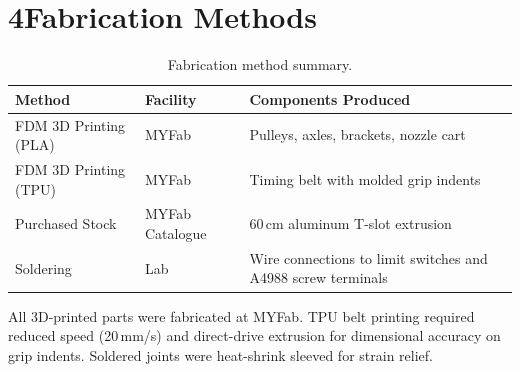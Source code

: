 \documentclass[12pt]{article}
\begin{document}
\section{4\quad Fabrication Methods}

\begin{table}[H]
\centering
\small
\begin{tabularx}{\textwidth}{@{}l l X@{}}
\toprule
\textbf{Method} & \textbf{Facility} & \textbf{Components Produced} \\
\midrule
FDM 3D Printing (PLA) & MYFab & Pulleys, axles, brackets, nozzle cart \\
FDM 3D Printing (TPU) & MYFab & Timing belt with molded grip indents \\
Purchased Stock        & MYFab Catalogue & 60\,cm aluminum T-slot extrusion \\
Soldering              & Lab & Wire connections to limit switches and A4988 screw terminals \\
\bottomrule
\end{tabularx}
\caption{Fabrication method summary.}
\end{table}

All 3D-printed parts were fabricated at MYFab. TPU belt printing required reduced speed (20\,mm/s) and direct-drive extrusion for dimensional accuracy on grip indents. Soldered joints were heat-shrink sleeved for strain relief.
\end{document}

